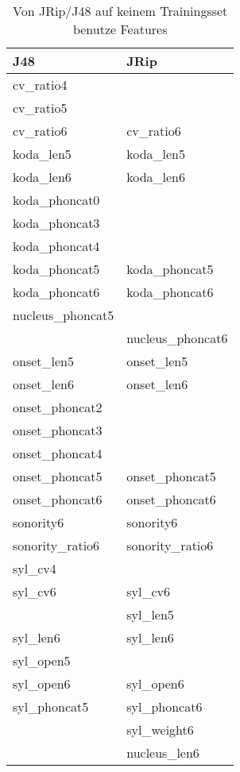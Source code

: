 \begin{wraptable}{r}{5cm}
    \centering
    \tiny
    \caption{Von JRip/J48 auf keinem Trainingsset benutze Features}
    \label{table:unused_features}
    \begin{tabular}{|l|l|}
    \hline
    {\bf J48}	 & {\bf JRip} \\\hline
    cv\_ratio4	&  \\
    cv\_ratio5	&  \\
    cv\_ratio6	 & cv\_ratio6\\\hline
    koda\_len5	 & koda\_len5 \\
    koda\_len6	 & koda\_len6\\\hline
    koda\_phoncat0	&  \\
    koda\_phoncat3	&  \\
    koda\_phoncat4	&  \\
    koda\_phoncat5	 & koda\_phoncat5 \\
    koda\_phoncat6	 & koda\_phoncat6\\\hline
    nucleus\_phoncat5	 & \\\hline
                    	 & nucleus\_phoncat6\\\hline
    onset\_len5	 & onset\_len5 \\
    onset\_len6	 & onset\_len6\\\hline
    onset\_phoncat2	&  \\
    onset\_phoncat3	&  \\
    onset\_phoncat4	&  \\
    onset\_phoncat5	 & onset\_phoncat5 \\
    onset\_phoncat6	 & onset\_phoncat6\\\hline
    sonority6	 & sonority6\\\hline
    sonority\_ratio6	 & sonority\_ratio6\\\hline
    syl\_cv4	&  \\
    syl\_cv6	 & syl\_cv6\\\hline
    	 & syl\_len5 \\
    syl\_len6	 & syl\_len6\\\hline
    syl\_open5	&  \\
    syl\_open6	 & syl\_open6\\\hline
    syl\_phoncat5	 & syl\_phoncat6 \\
    	 & syl\_weight6 \\
    	 & nucleus\_len6 \\\hline
    \end{tabular}
\end{wraptable}